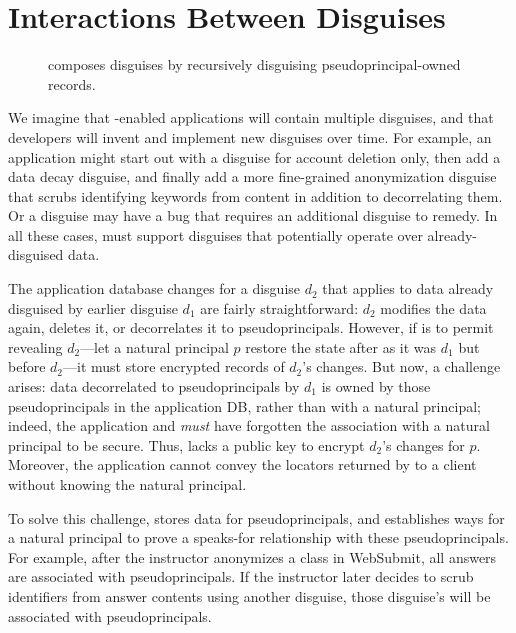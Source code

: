 \section{Interactions Between Disguises}
\label{s:composition}

\begin{figure}[t]
    \centering
    \caption{\sys composes disguises by recursively disguising
             pseudoprincipal-owned records.}
    \label{f:recursive}
\end{figure}

%
We imagine that \sys-enabled applications will contain multiple
disguises, and that developers will invent and implement new disguises
over time.
%
For example, an application might start out with a disguise for account
deletion only, then add a data decay disguise, and finally add a more
fine-grained anonymization disguise that scrubs identifying keywords
from content in addition to decorrelating them.
%
Or a disguise may have a bug that requires an additional disguise
to remedy.
%
In all these cases, \sys must support disguises that potentially
operate over already-disguised data.
%

%
The application database changes for a disguise $d_2$ that applies
to data already disguised by earlier disguise $d_1$ are fairly
straightforward: $d_2$ modifies the data again, deletes it, or
decorrelates it to pseudoprincipals.
%
However, if \sys is to permit revealing $d_2$---\ie let a natural
principal $p$ restore the state after as it was $d_1$ but before
$d_2$---it must store encrypted records of $d_2$'s changes.
%
But now, a challenge arises: data decorrelated to pseudoprincipals
by $d_1$ is owned by those pseudoprincipals in the application
DB, rather than with a natural principal; indeed, the application
and \sys \emph{must} have forgotten the association with a natural
principal to be secure.
%
Thus, \sys lacks a public key to encrypt $d_2$'s changes for $p$.
%
Moreover, the application cannot convey the locators returned by
\sys to a client without knowing the natural principal.
%

%
To solve this challenge, \sys stores data for pseudoprincipals,
and establishes ways for a natural principal to prove a speaks-for
relationship with these pseudoprincipals.
%
For example, after the instructor anonymizes a class in WebSubmit, all
answers are associated with pseudoprincipals.
%
If the instructor later decides to scrub identifiers from answer contents
using another disguise, those disguise's will be associated with
pseudoprincipals.
%
%

